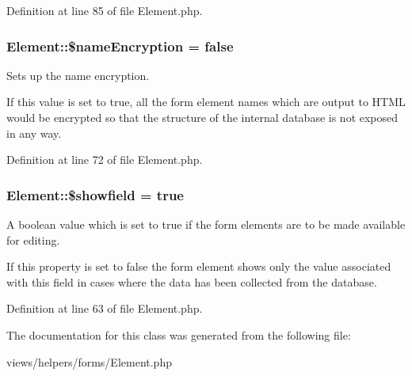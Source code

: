 Definition at line 85 of file Element.php.

\hypertarget{class_element_aa7f6ba35fe9572b1c2cbe6395711ea12}{
\subsubsection[{\$nameEncryption}]{\setlength{\rightskip}{0pt plus 5cm}Element::\$nameEncryption = false}}
\label{class_element_aa7f6ba35fe9572b1c2cbe6395711ea12}


Sets up the name encryption. 

If this value is set to true, all the form element names which are output to HTML would be encrypted so that the structure of the internal database is not exposed in any way. 

Definition at line 72 of file Element.php.

\hypertarget{class_element_a3c4fefc5dff30cf45b053266bb07efdf}{
\subsubsection[{\$showfield}]{\setlength{\rightskip}{0pt plus 5cm}Element::\$showfield = true}}
\label{class_element_a3c4fefc5dff30cf45b053266bb07efdf}


A boolean value which is set to true if the form elements are to be made available for editing. 

If this property is set to false the form element shows only the value associated with this field in cases where the data has been collected from the database. 

Definition at line 63 of file Element.php.



The documentation for this class was generated from the following file:\begin{DoxyCompactItemize}
\item 
views/helpers/forms/Element.php\end{DoxyCompactItemize}
